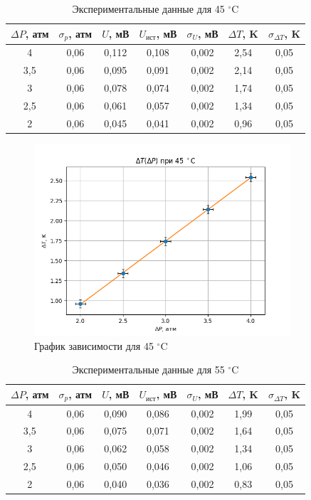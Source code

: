 \documentclass[a4paper,12pt]{article}
\begin{document}
\begin{table}[!ht]
    \centering
    \begin{tabular}{|c|c|c|c|c|c|c|}
    \hline
        $ \Delta P $, атм & $ \sigma_p $, атм & $ U $, мВ & $ U_{ист} $, мВ &$ \sigma_U $, мВ & $ \Delta T $, K & $ \sigma_{\Delta T} $, K \\ \hline
        4 & 0,06 & 0,112 & 0,108 & 0,002 & 2,54  & 0,05  \\ \hline
        3,5 & 0,06 & 0,095 & 0,091 & 0,002 & 2,14  & 0,05  \\ \hline
        3 & 0,06 & 0,078 & 0,074 & 0,002 & 1,74  & 0,05  \\ \hline
        2,5 & 0,06 & 0,061 & 0,057 & 0,002 & 1,34  & 0,05  \\ \hline
        2 & 0,06 & 0,045 & 0,041 & 0,002 & 0,96 & 0,05 \\ \hline
    \end{tabular}
    \caption{Экспериментальные данные для 45 $^\circ$C}
\end{table}

\begin{figure}[H]
    \centering
    \includegraphics[width=0.85\textwidth]{4.png}
    \caption{График зависимости для 45 $^\circ$C}
\end{figure}

\begin{table}[H]
    \centering
    \begin{tabular}{|c|c|c|c|c|c|c|}
    \hline
        $ \Delta P $, атм & $ \sigma_p $, атм & $ U $, мВ & $ U_{ист} $, мВ &$ \sigma_U $, мВ & $ \Delta T $, K & $ \sigma_{\Delta T} $, K \\ \hline
        4 & 0,06 & 0,090 & 0,086 & 0,002 & 1,99  & 0,05  \\ \hline
        3,5 & 0,06 & 0,075 & 0,071 & 0,002 & 1,64  & 0,05  \\ \hline
        3 & 0,06 & 0,062 & 0,058 & 0,002 & 1,34  & 0,05  \\ \hline
        2,5 & 0,06 & 0,050 & 0,046 & 0,002 & 1,06  & 0,05  \\ \hline
        2 & 0,06 & 0,040 & 0,036 & 0,002 & 0,83 & 0,05 \\ \hline
    \end{tabular}
    \caption{Экспериментальные данные для 55 $^\circ$C}
\end{table}
\end{document}
